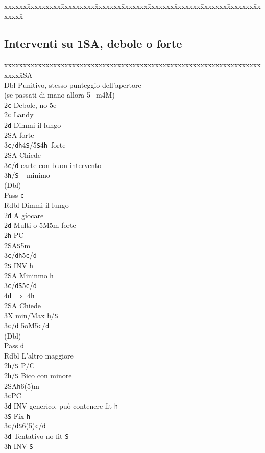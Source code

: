 \documentclass[a4paper,italian]{article}
\newcommand{\BS}{\small{\texttt{S}}}
\newcommand{\BC}{\small{\texttt{c}}}
\newcommand{\BD}{\small{\texttt{d}}}
\newcommand{\BH}{\small{\texttt{h}}}
\newenvironment{bidtable}
{\begin{tabbing}

    xxxxxx\=xxxxxxxxx\=xxxxxxxxx\=xxxxxxx\=xxxxxxx\=xxxxxxx\=xxxxxxx\=xxxxxxx\=xxxxxxx\=xxxxxxx\=\kill}
{\end{tabbing} }%
\begin{document}
\begin{multicols}{2}
\begin{bidtable}
    \end{bidtable}
    \vfill\null
    \columnbreak

    \subsection{Interventi su 1SA, debole o forte}

    \begin{bidtable}
        1\small{SA}--\+\\
        Dbl \> Punitivo, stesso punteggio dell'apertore\+\\(se passati di mano allora 5+m4M)\\
        2\BC\> Debole, no 5e\-\\
        2\BC \> Landy\+\\
        2\BD\> Dimmi il lungo\+\\
        2\small{SA} forte\\
        3\BC/\BD{}\BH4\BS/5\BS4\BH\ forte\-\\
        2\small{SA} \> Chiede\+\\
        3\BC/\BD{} carte con buon intervento\\
        3\BH/\BS{}+ minimo\-\\
        (Dbl)\+\\
        Pass \> \BC\\
        Rdbl \> Dimmi il lungo\\
        2\BD \> A giocare\-\-\\
        2\BD\> Multi o 5M5m forte\+\\
        2\BH\> PC\+\\
        2\small{SA}\BS5m\\
        3\BC/\BD{}\BH5\BC/\BD\-\\
        2\BS\> INV \BH\+\\
        2\small{SA}\> Mininmo \BH\\
        3\BC/\BD{}\BS5\BC/\BD\\
        4\BD\> $\Rightarrow$ 4\BH\-\\
        2\small{SA}\> Chiede\+\\
        3X\> min/Max \BH/\BS\-\\
        3\BC/\BD\> 5oM5\BC/\BD\\
        (Dbl)\+\\
        Pass \> \BD\\
        Rdbl \> L'altro maggiore\\
        2\BH/\BS \> P/C\-\-\\
        2\BH/\BS\> Bico con minore\\
        2\small{SA}\BH6(5)m\+\\
        3\BC\>PC\\
        3\BD\> INV generico, può contenere fit \BH\\
        3\BS\> Fix \BH\-\\
        3\BC/\BD{}\BS6(5)\BC/\BD\+\\
        3\BD\> Tentativo no fit \BS\\
        3\BH\> INV \BS
    \end{bidtable}


\end{multicols}
\end{document}
